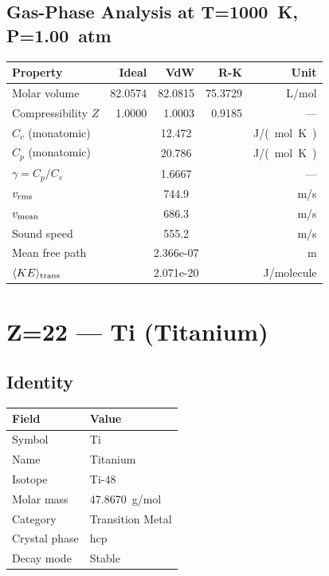\documentclass[11pt,a4paper]{article}
\begin{document}
\subsection{Gas-Phase Analysis at T=\SI{1000}{K}, P=\SI{1.00}{atm}}
\begin{tabular}{lrrrr}
  \toprule
  Property & Ideal & VdW & R-K & Unit \\
  \midrule
  Molar volume & 82.0574 & 82.0815 & 75.3729 & \si{L/mol} \\
  Compressibility $Z$ & 1.0000 & 1.0003 & 0.9185 & --- \\
  \midrule
  $C_v$ (monatomic) & \multicolumn{3}{c}{12.472} & \si{J/(mol.K)} \\
  $C_p$ (monatomic) & \multicolumn{3}{c}{20.786} & \si{J/(mol.K)} \\
  $\gamma = C_p/C_v$ & \multicolumn{3}{c}{1.6667} & --- \\
  $v_{\rm rms}$ & \multicolumn{3}{c}{744.9} & \si{m/s} \\
  $v_{\rm mean}$ & \multicolumn{3}{c}{686.3} & \si{m/s} \\
  Sound speed & \multicolumn{3}{c}{555.2} & \si{m/s} \\
  Mean free path & \multicolumn{3}{c}{2.366e-07} & \si{m} \\
  $\langle KE \rangle_{\rm trans}$ & \multicolumn{3}{c}{2.071e-20} & \si{J/molecule} \\
  \bottomrule
\end{tabular}

\newpage

\section{Z=22 --- Ti (Titanium)}
\label{sec:Z22}

\subsection{Identity}
\begin{tabular}{ll}
  \toprule
  Field & Value \\
  \midrule
  Symbol & Ti \\
  Name & Titanium \\
  Isotope & Ti-48 \\
  Molar mass & \SI{47.8670}{g/mol} \\
  Category & Transition Metal \\
  Crystal phase & hcp \\
  Decay mode & Stable \\
  \bottomrule
\end{tabular}
\end{document}
